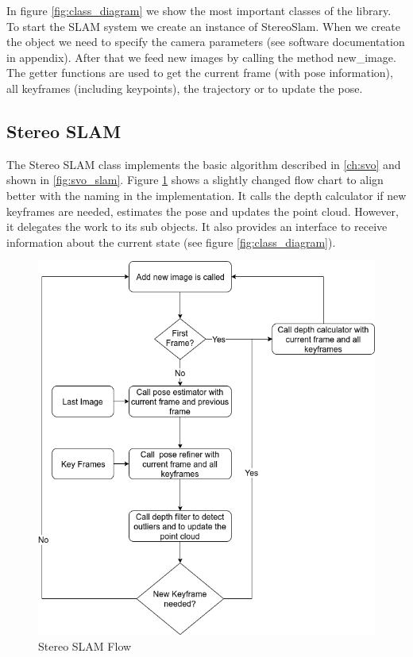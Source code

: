 \documentclass[11pt,a4paper,titlepage,oneside]{report}
\begin{document}
In figure \ref{fig:class_diagram} we show the most important classes of the library. To start the SLAM system we create an instance of StereoSlam. When we create the object we need to specify the camera parameters (see software documentation in appendix). After that we feed new images by calling the method new\_image. The getter functions are used to get the current frame (with pose information), all keyframes (including keypoints), the trajectory or to update the pose.

\subsection{Stereo SLAM}

The Stereo SLAM class implements the basic algorithm described in \ref{ch:svo} and shown in \ref{fig:svo_slam}. Figure \ref{fig:flow_stereo_slam} shows a slightly changed flow chart to align better with the naming in the implementation. It calls the depth calculator if new keyframes are needed, estimates the pose and updates the point cloud. However, it delegates the work to its sub objects. It also provides an interface to receive information about the current state (see figure \ref{fig:class_diagram}).

\begin{figure}[H]
  \centering
  \includegraphics[scale=0.3]{img/flow_stereo_slam.png}
  \caption{Stereo SLAM Flow}\label{fig:flow_stereo_slam}
\end{figure}
\end{document}
